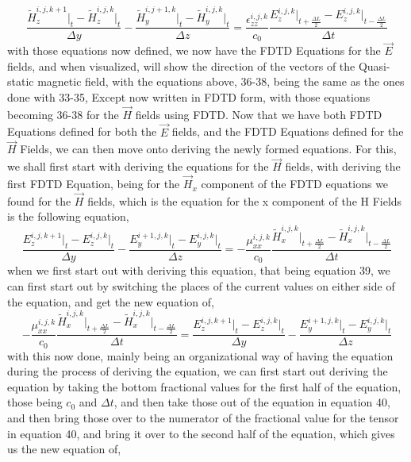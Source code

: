 \documentclass[]{article}
\begin{document}
\begin{equation}
\frac{\tilde{H}_{z}^{i,j,k+1} \Big|_t - \tilde{H}_{z}^{i,j,k}\Big|_t}{\Delta{y}} - \frac{\tilde{H}_{y}^{i, j + 1, k} \Big|_t - \tilde{H}_{y}^{i,j,k}\Big|_t}{\Delta{z}} = \frac{\epsilon_{zz}^{i,j,k}}{c_0} \frac{{E}_{z}^{i,j,k}\Big|_{t+\frac{\Delta{L}}{2}} -E_{z}^{i,j,k}\Big|_{t - \frac{\Delta{L}}{2}}}{\Delta{t}}
\end{equation}
with those equations now defined, we now have the FDTD Equations for the $\vec{E}$ fields, and when visualized, will show the direction of the vectors of the Quasi-static magnetic field, with the equations above, 36-38, being the same as the ones done with 33-35, Except now written in FDTD form, with those equations becoming 36-38 for the $\vec{H}$ fields using FDTD. Now that we have both FDTD Equations defined for both the $\vec{E}$ fields, and the FDTD Equations defined for the $\vec{H}$ Fields, we can then move onto deriving the newly formed equations. For this, we shall first start with deriving the equations for the $\vec{H}$ fields, with deriving the first FDTD Equation, being for the $\vec{H}_x$ component of the FDTD equations we found for the $\vec{H}$ fields, which is the equation for the x component of the H Fields is the following equation, 
\begin{equation}
\frac{E_{z}^{i, j, k+1} \Big|_t - E_{z}^{i,j,k}\Big|_t}{\Delta{y}} - \frac{E_{y}^{i+1, j, k} \Big|_t - E_{y}^{i,j,k}\Big|_t}{\Delta{z}} = -\frac{\mu_{xx}^{i,j,k}}{c_0} \frac{\tilde{H}_{x}^{i,j,k}\Big|_{t+\frac{\Delta{L}}{2}} - \tilde{H}_{x}^{i,j,k}\Big|_{t - \frac{\Delta{L}}{2}}}{\Delta{t}}
\end{equation}
when we first start out with deriving this equation, that being equation 39, we can first start out by switching the places of the current values on either side of the equation, and get the new equation of,
\\
\begin{equation}
-\frac{\mu_{xx}^{i,j,k}}{c_0} \frac{\tilde{H}_{x}^{i,j,k}\Big|_{t+\frac{\Delta{L}}{2}} - \tilde{H}_{x}^{i,j,k}\Big|_{t - \frac{\Delta{L}}{2}}}{\Delta{t}} = \frac{E_{z}^{i, j, k+1} \Big|_t - E_{z}^{i,j,k}\Big|_t}{\Delta{y}} - \frac{E_{y}^{i+1, j, k} \Big|_t - E_{y}^{i,j,k}\Big|_t}{\Delta{z}}
\end{equation}
with this now done, mainly being an organizational way of having the equation during the process of deriving the equation, we can first start out deriving the equation by taking the bottom fractional values for the first half of the equation, those being $c_0$ and $\Delta{t}$, and then take those out of the equation in equation 40, and then bring those over to the numerator of the fractional value for the tensor in equation 40, and bring it over to the second half of the equation, which gives us the new equation of,
\end{document}
